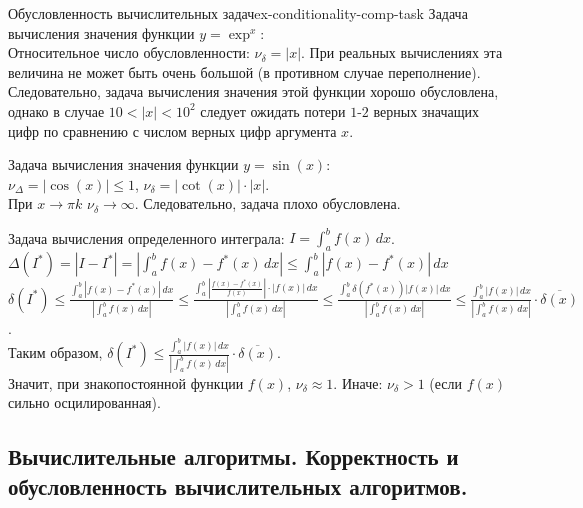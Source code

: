 \documentclass[14pt]{extarticle}
\begin{document}
    \begin{example}{Обусловленность вычислительных задач}{ex-conditionality-comp-task}
        Задача вычисления значения функции $y = \exp^{x}$:\\
        Относительное число обусловленности: $\nu_{\delta} = |x|$. При реальных вычислениях эта величина не может быть очень большой (в противном случае переполнение).\\
        Следовательно, задача вычисления значения этой функции хорошо обусловлена, однако в случае $10 < |x| < 10^{2}$ следует ожидать потери $1$-$2$ верных значащих цифр по сравнению с числом верных цифр аргумента $x$.

        \vspace{\baselineskip}

        Задача вычисления значения функции $y = \sin(x)$:\\
        $\nu_{\Delta} = |\cos(x)| \leq 1$, $\nu_{\delta} = |\cot(x)| \cdot |x|$.\\
        При $x \rightarrow \pi k$ $\nu_{\delta} \rightarrow \infty$. Следовательно, задача плохо обусловлена.

        \vspace{\baselineskip}

        Задача вычисления определенного интеграла: $I = \int_{a}^{b} f(x) \, dx$.\\
        $\Delta(I^{*}) = |I - I^{*}| = |\int_{a}^{b} f(x) - f^{*}(x) \, dx| \leq \int_{a}^{b} |f(x) - f^{*}(x)| \, dx$\\
        $\delta(I^{*}) \leq \frac{\int_{a}^{b} |f(x) - f^{*}(x)| \, dx}{|\int_{a}^{b} f(x) \, dx|} \leq \frac{\int_{a}^{b} |\frac{f(x) - f^{*}(x)}{f(x)}| \cdot |f(x)| \, dx}{|\int_{a}^{b} f(x) \, dx|} \leq \frac{\int_{a}^{b} \delta(f^{*}(x)) |f(x)| \, dx}{|\int_{a}^{b} f(x) \, dx|} \leq \frac{\int_{a}^{b} |f(x)| \, dx}{|\int_{a}^{b} f(x) \, dx|} \cdot \overline{\delta(x)}$.\\

        Таким образом, $\delta(I^{*}) \leq \frac{\int_{a}^{b} |f(x)| \, dx}{|\int_{a}^{b} f(x) \, dx|} \cdot \overline{\delta(x)}$.\\
        Значит, при знакопостоянной функции $f(x)$, $\nu_{\delta} \approx 1$. Иначе: $\nu_{\delta} > 1$ (если $f(x)$ сильно осцилированная).
    \end{example}

\clearpage
\subsection{Вычислительные алгоритмы. Корректность и обусловленность вычислительных алгоритмов.}
\end{document}

